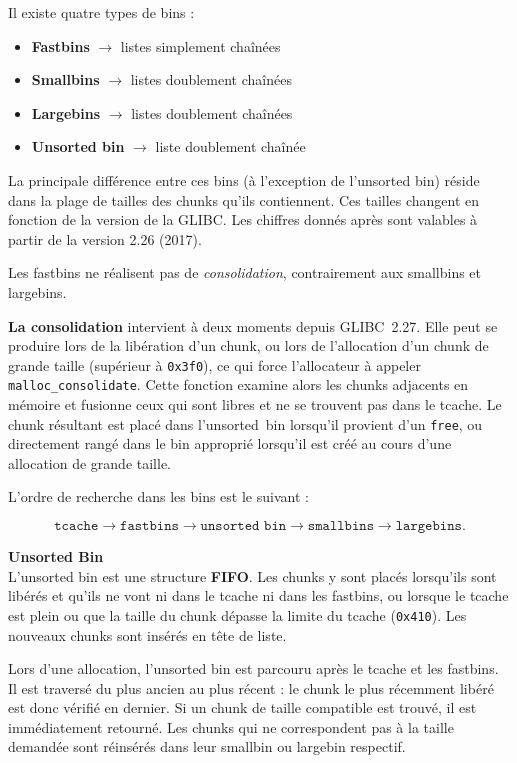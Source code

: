 Il existe quatre types de bins :
\begin{itemize}
    \item \textbf{Fastbins} $\rightarrow$ listes simplement chaînées
    \item \textbf{Smallbins} $\rightarrow$ listes doublement chaînées
    \item \textbf{Largebins} $\rightarrow$ listes doublement chaînées
    \item \textbf{Unsorted bin} $\rightarrow$ liste doublement chaînée
\end{itemize}

La principale différence entre ces bins (à l'exception de l'unsorted bin) réside dans la
plage de tailles des chunks qu'ils contiennent.
Ces tailles changent en fonction de la version de la GLIBC.
Les chiffres donnés après sont valables à partir de la version 2.26 (2017).

\noindent Les fastbins ne réalisent pas de \textit{consolidation}, contrairement aux smallbins et largebins.

\textbf{La consolidation} intervient à deux moments depuis GLIBC~2.27.
Elle peut se produire lors de la libération d’un chunk, ou lors de
l’allocation d’un chunk de grande taille (supérieur à \texttt{0x3f0}),
ce qui force l’allocateur à appeler \texttt{malloc\_consolidate}.
Cette fonction examine alors les chunks adjacents en mémoire et fusionne
ceux qui sont libres et ne se trouvent pas dans le tcache. Le chunk
résultant est placé dans l’unsorted~bin lorsqu’il provient d’un
\texttt{free}, ou directement rangé dans le bin approprié lorsqu’il est
créé au cours d’une allocation de grande taille.


L'ordre de recherche dans les bins est le suivant :


\[
    \texttt{tcache} \rightarrow \texttt{fastbins} \rightarrow \texttt{unsorted bin} \rightarrow \texttt{smallbins} \rightarrow \texttt{largebins}.
\]



\vp

\noindent\textbf{Unsorted Bin}\\
L'unsorted bin est une structure \textbf{FIFO}.
Les chunks y sont placés lorsqu'ils sont libérés et qu'ils ne vont ni dans le tcache
ni dans les fastbins, ou lorsque le tcache est plein ou que la taille du chunk dépasse
la limite du tcache (\texttt{0x410}).
Les nouveaux chunks sont insérés en tête de liste.

Lors d'une allocation, l'unsorted bin est parcouru après le tcache et les fastbins.
Il est traversé du plus ancien au plus récent : le chunk le plus récemment libéré est
donc vérifié en dernier.
Si un chunk de taille compatible est trouvé, il est immédiatement retourné.
Les chunks qui ne correspondent pas à la taille demandée sont réinsérés dans leur
smallbin ou largebin respectif.


